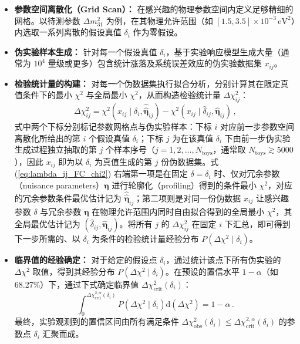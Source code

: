 \begin{itemize}[leftmargin=*,nosep]
  \item \textbf{参数空间离散化（Grid Scan）：} 在感兴趣的物理参数空间内定义足够精细的网格。以待测参数 $\Delta m^2_{31}$ 为例，在其物理允许范围（如 $[1.5, 3.5] \times 10^{-3}\,\mathrm{eV}^2$）内选取一系列离散的假设真值 $\delta_i$ 作为零假设。

  \item \textbf{伪实验样本生成：} 针对每一个假设真值 $\delta_i$，基于实验响应模型生成大量（通常为 $10^4$ 量级或更多）包含统计涨落及系统误差效应的伪实验数据集 $x_{ij}$。

  \item \textbf{检验统计量的构建：} 对每一个伪数据集执行拟合分析，分别计算其在限定真值条件下的最小 $\chi^2$ 与全局最小 $\chi^2$，从而构造检验统计量 $\Delta\chi^2_{ij}$：
  \begin{equation}\label{eq:lambda_ij_FC_chi2}
    \Delta\chi^2_{ij} = \chi^2(x_{ij} \mid \delta_i, \hat{\hat{\boldsymbol{\eta}}}_{ij}) - \chi^2(x_{ij} \mid \hat{\delta}_{ij}, \hat{\boldsymbol{\eta}}_{ij}) \,,
  \end{equation}
  式中两个下标分别标记参数网格点与伪实验样本：下标 $i$ 对应前一步参数空间离散化所给出的第 $i$ 个假设真值 $\delta_i$；下标 $j$ 为在该真值 $\delta_i$ 下由前一步伪实验生成过程独立抽取的第 $j$ 个样本序号（$j=1,2,\ldots,N_{\mathrm{toys}}$，通常取 $N_{\mathrm{toys}}\gtrsim 5000$），因此 $x_{ij}$ 即为以 $\delta_i$ 为真值生成的第 $j$ 份伪数据集。式 (\ref{eq:lambda_ij_FC_chi2}) 右端第一项是在固定 $\delta = \delta_i$ 时、仅对冗余参数（nuisance parameters）$\boldsymbol{\eta}$ 进行轮廓化（profiling）得到的条件最小 $\chi^2$，对应的冗余参数条件最优估计记为 $\hat{\hat{\boldsymbol{\eta}}}_{ij}$；第二项则是对同一份伪数据 $x_{ij}$ 让感兴趣参数 $\delta$ 与冗余参数 $\boldsymbol{\eta}$ 在物理允许范围内同时自由拟合得到的全局最小 $\chi^2$，其全局最优估计记为 $(\hat{\delta}_{ij},\hat{\boldsymbol{\eta}}_{ij})$。将所有 $j$ 的 $\Delta\chi^2_{ij}$ 在固定 $i$ 下汇总，即可得到下一步所需的、以 $\delta_i$ 为条件的检验统计量经验分布 $P(\Delta\chi^2\mid\delta_i)$。

  \item \textbf{临界值的经验确定：} 对于给定的假设点 $\delta_i$，通过统计该点下所有伪实验的 $\Delta\chi^2$ 取值，得到其经验分布 $P(\Delta\chi^2 \mid \delta_i)$。在预设的置信水平 $1-\alpha$（如 68.27\%）下，通过下式确定临界值 $\Delta\chi^2_{\mathrm{crit}}(\delta_i)$：
  \begin{equation}
    \int_0^{\Delta\chi^{2,\alpha}_{\mathrm{crit}}(\delta_i)} P\left(\Delta\chi^2 \mid \delta_i\right) \mathrm{d}(\Delta\chi^2) = 1-\alpha \,.
    \label{eq:FC_integral}
  \end{equation}
  最终，实验观测到的置信区间由所有满足条件 $\Delta\chi^2_{\mathrm{obs}}(\delta_i) \le \Delta\chi^{2,\alpha}_{\mathrm{crit}}(\delta_i)$ 的参数点 $\delta_i$ 汇聚而成。
\end{itemize}


